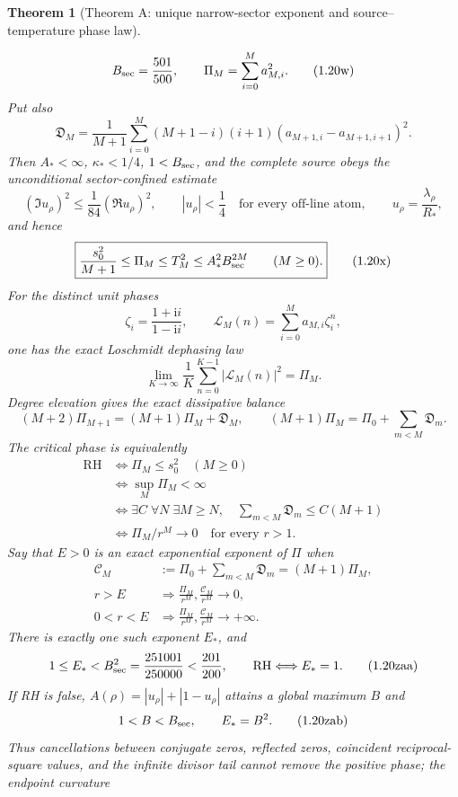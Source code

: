 \documentclass[11pt]{article}
\newtheorem{theorem}{Theorem}[section]
\begin{document}
\begin{theorem}[Theorem A: unique narrow-sector exponent and source--temperature phase law]
\begin{enumerate}[label=\textup{(\roman*)}]
\[ B_{\rm sec}=\frac{501}{500},\qquad
 \Pi_M=\sum_{i=0}^M a_{M,i}^2.
 \tag{1.20w}
\]
Put also
\[
 \mathfrak D_M=\frac1{M+1}\sum_{i=0}^{M}(M+1-i)(i+1)
 (a_{M+1,i}-a_{M+1,i+1})^2.
 \tag{1.20wb}
\]
Then $A_*<\infty$, $\kappa_*<1/4$, $1<B_{\rm sec}$, and the complete source obeys the
unconditional sector-confined estimate
\[
 (\Im u_\rho)^2\le\frac1{84}(\Re u_\rho)^2,
 \qquad |u_\rho|<\frac14\quad\text{for every off-line atom},
 \qquad u_\rho=\frac{\lambda_\rho}{R_*},
 \tag{1.20wa}
\]
and hence
\[
 \boxed{
 \frac{s_0^2}{M+1}\le\Pi_M\le T_M^2
 \le A_*^2B_{\rm sec}^{2M}\qquad(M\ge0).}
 \tag{1.20x}
\]
For the distinct unit phases
\[
 \zeta_i=\frac{1+\mathrm i i}{1-\mathrm i i},\qquad
 \mathcal L_M(n)=\sum_{i=0}^M a_{M,i}\zeta_i^n,
\]
one has the exact Loschmidt dephasing law
\[
 \lim_{K\to\infty}\frac1K\sum_{n=0}^{K-1}|\mathcal L_M(n)|^2=\Pi_M.
 \tag{1.20y}
\]
Degree elevation gives the exact dissipative balance
\[
 (M+2)\Pi_{M+1}=(M+1)\Pi_M+\mathfrak D_M,
 \qquad
 (M+1)\Pi_M=\Pi_0+\sum_{m<M}\mathfrak D_m.
 \tag{1.20ya}
\]
The critical phase is equivalently
\[
 \boxed{\begin{aligned}
 \mathrm{RH}
 &\Longleftrightarrow \Pi_M\le s_0^2\quad(M\ge0)\\
 &\Longleftrightarrow \sup_M\Pi_M<\infty\\
 &\Longleftrightarrow
 \exists C\;\forall N\;\exists M\ge N,
 \quad \sum_{m<M}\mathfrak D_m\le C(M+1)\\
 &\Longleftrightarrow
 \Pi_M/r^M\longrightarrow0\quad\text{for every }r>1.
 \end{aligned}}
 \tag{1.20z}
\]
Say that $E>0$ is an exact exponential exponent of $\Pi$ when
\[
 \begin{aligned}
 \mathcal C_M&:=\Pi_0+\sum_{m<M}\mathfrak D_m=(M+1)\Pi_M,\\
 r>E&\Longrightarrow
 \frac{\Pi_M}{r^M},\frac{\mathcal C_M}{r^M}\longrightarrow0,\\
 0<r<E&\Longrightarrow
 \frac{\Pi_M}{r^M},\frac{\mathcal C_M}{r^M}\longrightarrow+\infty.
 \end{aligned}
 \tag{1.20za}
\]
There is exactly one such exponent $E_*$, and
\[
 1\le E_*<B_{\rm sec}^2=\frac{251001}{250000}<\frac{201}{200},
 \qquad \mathrm{RH}\Longleftrightarrow E_*=1.
 \tag{1.20zaa}
\]
If RH is false, $A(\rho)=|u_\rho|+|1-u_\rho|$ attains a global maximum $B$ and
\[
 1<B<B_{\rm sec},\qquad E_*=B^2.
 \tag{1.20zab}
\]
Thus cancellations between conjugate zeros, reflected zeros, coincident reciprocal-square
values, and the infinite divisor tail cannot remove the positive phase; the endpoint curvature

\end{enumerate}
\end{theorem}
\end{document}
